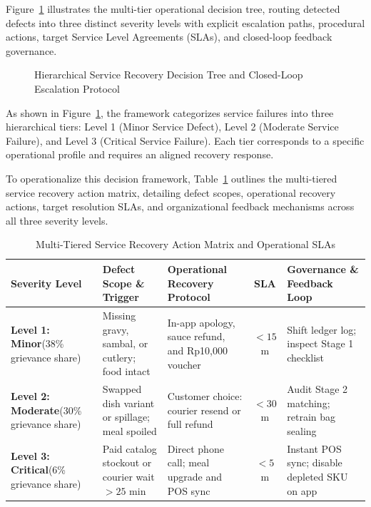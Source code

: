 \documentclass{jomas}
\begin{document}
Figure~\ref{fig:recovery-decision-tree} illustrates the multi-tier operational decision tree, routing detected defects into three distinct severity levels with explicit escalation paths, procedural actions, target Service Level Agreements (SLAs), and closed-loop feedback governance.

\begin{figure}[t]
\centering
\resizebox{0.76\textwidth}{!}{}
\caption{Hierarchical Service Recovery Decision Tree and Closed-Loop Escalation Protocol}
\label{fig:recovery-decision-tree}
\end{figure}

As shown in Figure~\ref{fig:recovery-decision-tree}, the framework categorizes service failures into three hierarchical tiers: Level 1 (Minor Service Defect), Level 2 (Moderate Service Failure), and Level 3 (Critical Service Failure). Each tier corresponds to a specific operational profile and requires an aligned recovery response.

To operationalize this decision framework, Table~\ref{tab:service-recovery-matrix} outlines the multi-tiered service recovery action matrix, detailing defect scopes, operational recovery actions, target resolution SLAs, and organizational feedback mechanisms across all three severity levels.

\begin{table}[H]
\caption{Multi-Tiered Service Recovery Action Matrix and Operational SLAs}
\label{tab:service-recovery-matrix}
\centering
\small
\renewcommand{\arraystretch}{0.95}
\setlength{\tabcolsep}{3pt}
\begin{tabularx}{\textwidth}{p{2.8cm} p{3.4cm} X c p{3.6cm}}
\toprule
\textbf{Severity Level} & \textbf{Defect Scope \& Trigger} & \textbf{Operational Recovery Protocol} & \textbf{SLA} & \textbf{Governance \& Feedback Loop} \\
\midrule
\textbf{Level 1: Minor}\newline (38\% grievance share) & Missing gravy, sambal, or cutlery; food intact & In-app apology, sauce refund, and Rp10,000 voucher & $<15$m & Shift ledger log; inspect Stage 1 checklist \\
\textbf{Level 2: Moderate}\newline (30\% grievance share) & Swapped dish variant or spillage; meal spoiled & Customer choice: courier resend or full refund & $<30$m & Audit Stage 2 matching; retrain bag sealing \\
\textbf{Level 3: Critical}\newline (6\% grievance share) & Paid catalog stockout or courier wait $>25$ min & Direct phone call; meal upgrade and POS sync & $<5$m & Instant POS sync; disable depleted SKU on app \\
\bottomrule
\end{tabularx}
\end{table}
\end{document}
